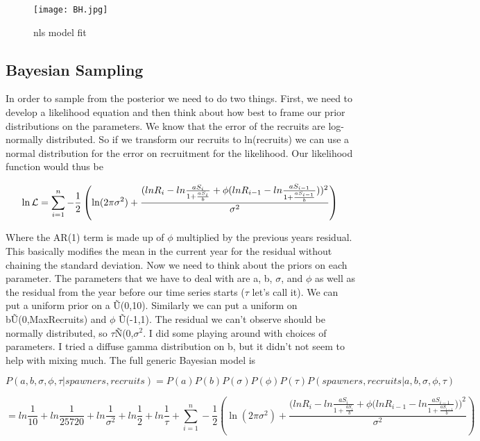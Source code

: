 \documentclass{article}
\begin{document}
\begin{figure}[H]
    \centering
    \texttt{[image: BH.jpg]}
    \caption{nls model fit}
    \label{Fig.1}
\end{figure}

\subsection{Bayesian Sampling}
In order to sample from the posterior we need to do two things. First, we need to develop a likelihood equation and then think about how best to frame our prior distributions on the parameters. We know that the error of the recruits are log-normally distributed. So if we transform our recruits to ln(recruits) we can use a normal distribution for the error on recruitment for the likelihood. Our likelihood function would thus be

\begin{equation}
 \ln{\cal L} = \sum\limits_{i=1}^n - \frac{1}{2}\left(\ln(2\pi\sigma^2)+\frac{{(ln{R_i}-ln{\frac{aS_i}{1+\frac{aS_i}{b}}}+\phi(ln{R_{i-1}}-ln{\frac{aS_{i-1}}{1+\frac{aS_{i-1}}{b}}}}))^2}{\sigma^2}\right)
   \end{equation}

Where the AR(1) term is made up of $\phi$ multiplied by the previous years residual. This basically modifies the mean in the current year for the residual without chaining the standard deviation.
Now we need to think about the priors on each parameter. The parameters that we have to deal with are a, b, $\sigma$, and $\phi$ as well as the residual from the year before our time series starts ($\tau$ let's call it). We can put a uniform prior on a \~ U(0,10). Similarly we can put a uniform on b\~U(0,MaxRecruits) and $\phi$ \~ U(-1,1). The residual we can't observe should be normally distributed, so $\tau$\~N(0,$\sigma^2$. I did some playing around with choices of parameters. I tried a diffuse gamma distribution on b, but it didn't not seem to help with mixing much. 
The full generic Bayesian model is 

\begin{equation*}
P(a,b,\sigma,\phi,\tau\vert spawners, recruits) = P(a)P(b)P(\sigma)P(\phi) P(\tau)P( spawners, recruits\vert a,b,\sigma,\phi,\tau)
   \end{equation*}

\begin{equation*}
= ln\frac{1}{10}+ln\frac{1}{25720}+ln\frac{1}{\sigma^2}+ln\frac{1}{2}+ln\frac{1}{\tau} + \sum\limits_{i=1}^n - \frac{1}{2}\left(\ln(2\pi\sigma^2)+\frac{{(ln{R_i}-ln{\frac{aS_i}{1+\frac{aS_i}{b}}}+\phi(ln{R_{i-1}}-ln{\frac{aS_{i-1}}{1+\frac{aS_{i-1}}{b}}}}))^2}{\sigma^2}\right)
   \end{equation*}
   
\end{document}
